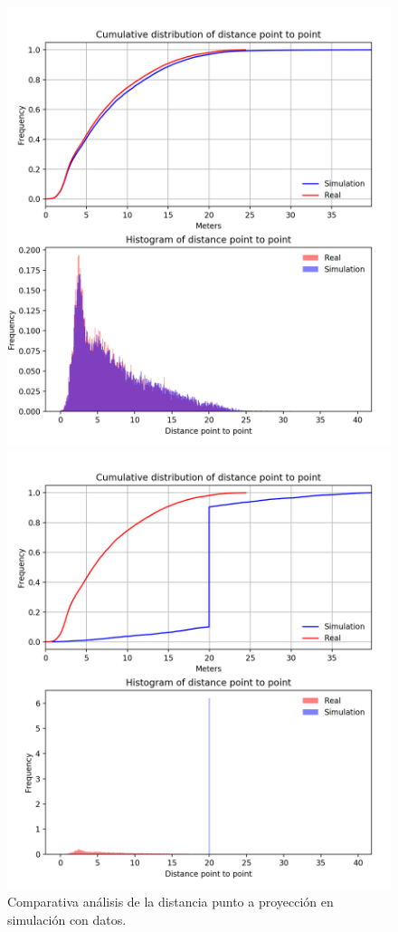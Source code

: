 \begin{figure}[!htb]
\begin{minipage}{0.48\textwidth}
\centering
\includegraphics[width=1.2\textwidth]{./Imagenes/SimulationComparativeNormalized.png}
\caption{Comparativa análisis de la distancia punto a proyección en simulación con datos.}
\label{figure:ComparativaReal}
\end{minipage}\hfill
\begin{minipage}{0.48\textwidth}
\centering
\includegraphics[width=1.2\textwidth]{./Imagenes/SimulationComparativeEmptyNormalized.png}

\end{minipage}
\end{figure}
